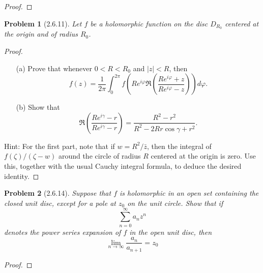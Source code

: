 \documentclass[10pt]{article}
\newcommand{\sk}{\vskip 10mm}
\theoremstyle{plain}
\newtheorem{problem}{Problem}
\theoremstyle{remark}
\begin{document}
\begin{proof}
  
\end{proof}

\sk

\begin{problem}[2.6.11]
  Let $f$ be a holomorphic function on the disc $D_{R_0}$ centered at the
  origin and of radius $R_0$.
\end{problem}

\begin{proof}
  \begin{itemize}
  \item[(a)] Prove that whenever $0<R<R_0$ and $|z|<R$, then
    \[
      f(z)=\frac{1}{2\pi}\int_0^{2\pi}f(Re^{i\varphi}\Re\left(\frac{Re^{i\varphi}+z}{Re^{i\varphi}-z}\right))d\varphi.
    \]
  \item[(b)] Show that
    \[
      \Re\left(\frac{Re^{i\gamma}-r}{Re^{i\gamma}-r}\right) = \frac{R^2-r^2}{R^2-2Rr\cos\gamma + r^2}.
    \]
  \end{itemize}
  Hint: For the first part, note that if $w=R^2/\bar{z}$, then the integral of
  $f(\zeta)/(\zeta-w)$ around the circle of radius $R$ centered at the origin is
  zero. Use this, together with the usual Cauchy integral formula, to deduce
  the desired identity.
\end{proof}

\sk

\begin{problem}[2.6.14]
  Suppose that $f$ is holomorphic in an open set containing the closed unit
  disc, except for a pole at $z_0$ on the unit circle. Show that if
  \[
    \sum_{n=0}^\infty a_nz^n
  \]
  denotes the power series expansion of $f$ in the open unit disc, then
  \[
    \lim_{n\rightarrow\infty}\frac{a_n}{a_{n+1}}=z_0
  \]
\end{problem}

\begin{proof}
  
\end{proof}

\end{document}
